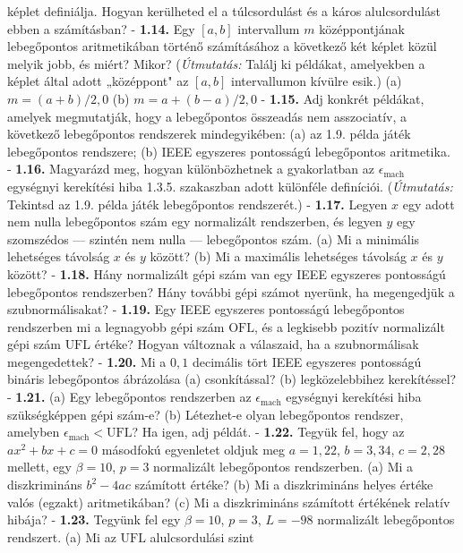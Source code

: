 \documentclass[
  magyar,
  11pt]{article}
\begin{document}
képlet definiálja. Hogyan kerülheted el a túlcsordulást és a káros
alulcsordulást ebben a számításban? - \textbf{1.14.} Egy \([a, b]\)
intervallum \(m\) középpontjának lebegőpontos aritmetikában történő
számításához a következő két képlet közül melyik jobb, és miért? Mikor?
(\emph{Útmutatás:} Találj ki példákat, amelyekben a képlet által adott
„középpont" az \([a, b]\) intervallumon kívülre esik.) (a)
\(m = (a + b)/2{,}0\) (b) \(m = a + (b - a)/2{,}0\) - \textbf{1.15.} Adj
konkrét példákat, amelyek megmutatják, hogy a lebegőpontos összeadás nem
asszociatív, a következő lebegőpontos rendszerek mindegyikében: (a) az
1.9. példa játék lebegőpontos rendszere; (b) IEEE egyszeres pontosságú
lebegőpontos aritmetika. - \textbf{1.16.} Magyarázd meg, hogyan
különbözhetnek a gyakorlatban az \(\epsilon_{\text{mach}}\) egységnyi
kerekítési hiba 1.3.5. szakaszban adott különféle definíciói.
(\emph{Útmutatás:} Tekintsd az 1.9. példa játék lebegőpontos
rendszerét.) - \textbf{1.17.} Legyen \(x\) egy adott nem nulla
lebegőpontos szám egy normalizált rendszerben, és legyen \(y\) egy
szomszédos --- szintén nem nulla --- lebegőpontos szám. (a) Mi a
minimális lehetséges távolság \(x\) és \(y\) között? (b) Mi a maximális
lehetséges távolság \(x\) és \(y\) között? - \textbf{1.18.} Hány
normalizált gépi szám van egy IEEE egyszeres pontosságú lebegőpontos
rendszerben? Hány további gépi számot nyerünk, ha megengedjük a
szubnormálisakat? - \textbf{1.19.} Egy IEEE egyszeres pontosságú
lebegőpontos rendszerben mi a legnagyobb gépi szám \(\text{OFL}\), és a
legkisebb pozitív normalizált gépi szám \(\text{UFL}\) értéke? Hogyan
változnak a válaszaid, ha a szubnormálisak megengedettek? -
\textbf{1.20.} Mi a \(0{,}1\) decimális tört IEEE egyszeres pontosságú
bináris lebegőpontos ábrázolása (a) csonkítással? (b) legközelebbihez
kerekítéssel? - \textbf{1.21.} (a) Egy lebegőpontos rendszerben az
\(\epsilon_{\text{mach}}\) egységnyi kerekítési hiba szükségképpen gépi
szám-e? (b) Létezhet-e olyan lebegőpontos rendszer, amelyben
\(\epsilon_{\text{mach}} < \text{UFL}\)? Ha igen, adj példát. -
\textbf{1.22.} Tegyük fel, hogy az \(ax^2 + bx + c = 0\) másodfokú
egyenletet oldjuk meg \(a = 1{,}22\), \(b = 3{,}34\), \(c = 2{,}28\)
mellett, egy \(\beta = 10\), \(p = 3\) normalizált lebegőpontos
rendszerben. (a) Mi a diszkrimináns \(b^2 - 4ac\) számított értéke? (b)
Mi a diszkrimináns helyes értéke valós (egzakt) aritmetikában? (c) Mi a
diszkrimináns számított értékének relatív hibája? - \textbf{1.23.}
Tegyünk fel egy \(\beta = 10\), \(p = 3\), \(L = -98\) normalizált
lebegőpontos rendszert. (a) Mi az \(\text{UFL}\) alulcsordulási szint
\end{document}
